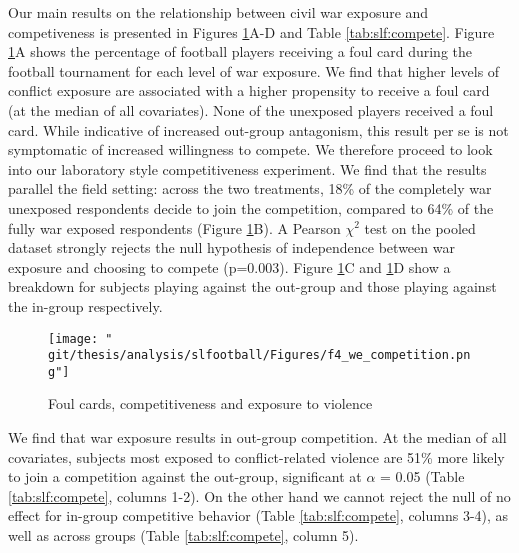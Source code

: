 Our main results on the relationship between civil war exposure and competiveness is presented in Figures \ref{fig:slf:we_competition}A-D and Table \ref{tab:slf:compete}. Figure \ref{fig:slf:we_competition}A shows the percentage of football players receiving a foul card during the football tournament for each level of war exposure. We find that higher levels of conflict exposure are associated with a higher propensity to receive a foul card (at the median of all covariates). None of the unexposed players received a foul card. While indicative of increased out-group antagonism, this result per se is not symptomatic of increased willingness to compete. We therefore proceed to look into our laboratory style competitiveness experiment. We find that the results parallel the field setting: across the two treatments, 18\% of the completely war unexposed respondents decide to join the competition, compared to 64\% of the fully war exposed respondents (Figure \ref{fig:slf:we_competition}B). A Pearson $\chi^2$ test on the pooled dataset strongly rejects the null hypothesis of independence between war exposure and choosing to compete (p=0.003). Figure \ref{fig:slf:we_competition}C and \ref{fig:slf:we_competition}D show a breakdown for subjects playing against the out-group and those playing against the in-group respectively. 

\begin{figure}[htb]
  \texttt{[image: "\\git/thesis/analysis/slfootball/Figures/f4\_we\_competition.png"]}
  \caption{Foul cards, competitiveness and exposure to violence}
  \label{fig:slf:we_competition}
\end{figure}

We find that war exposure results in out-group competition. At the median of all covariates, subjects most exposed to conflict-related violence are 51\% more likely to join a competition against the out-group, significant at $\alpha$ = 0.05 (Table \ref{tab:slf:compete}, columns 1-2).  On the other hand we cannot reject the null of no effect for in-group competitive behavior (Table \ref{tab:slf:compete}, columns 3-4), as well as across groups (Table \ref{tab:slf:compete}, column 5). 

